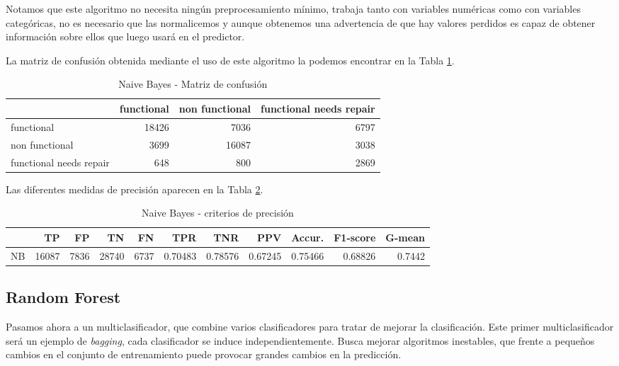 \documentclass[a4paper, 20pt]{article}
\begin{document}
Notamos que este algoritmo no necesita ningún preprocesamiento mínimo, trabaja tanto con variables numéricas como con variables categóricas, no es necesario que las normalicemos y aunque obtenemos una advertencia de que hay valores perdidos es capaz de obtener información sobre ellos que luego usará en el predictor.

La matriz de confusión obtenida mediante el uso de este algoritmo la podemos encontrar en la Tabla \ref{tab:CMNaiveBayes}.

\begin{table}[H]
\centering
  \caption{Naive Bayes - Matriz de confusión}
  \label{tab:CMNaiveBayes}
  \begin{tabular}{lrrr}
\toprule
    & functional & non functional & functional needs repair\\ \midrule
    functional & 18426 & 7036 & 6797\\
    non functional & 3699 & 16087 & 3038\\
    functional needs repair & 648 & 800 & 2869\\
    \bottomrule
  \end{tabular}
\end{table}

Las diferentes medidas de precisión aparecen en la Tabla \ref{tab:NaiveBayes}.
\begin{table}[H]
  \centering
  \caption{Naive Bayes - criterios de precisión}
  \label{tab:NaiveBayes}
  \begin{tabular}{lrrrrrrrrrr}
    \toprule
    & TP & FP & TN & FN & TPR & TNR & PPV & Accur. & F1-score & G-mean\\ \midrule
NB & 16087 & 7836 & 28740 & 6737 & 0.70483 & 0.78576 & 0.67245 & 0.75466 & 0.68826 & 0.7442\\
\bottomrule
  \end{tabular}
\end{table}

\subsection{Random Forest}

Pasamos ahora a un multiclasificador, que combine varios clasificadores para tratar de mejorar la clasificación. Este primer multiclasificador será un ejemplo de \textit{bagging}, cada clasificador se induce independientemente. Busca mejorar algoritmos inestables, que frente a pequeños cambios en el conjunto de entrenamiento puede provocar grandes cambios en la predicción.
\end{document}
